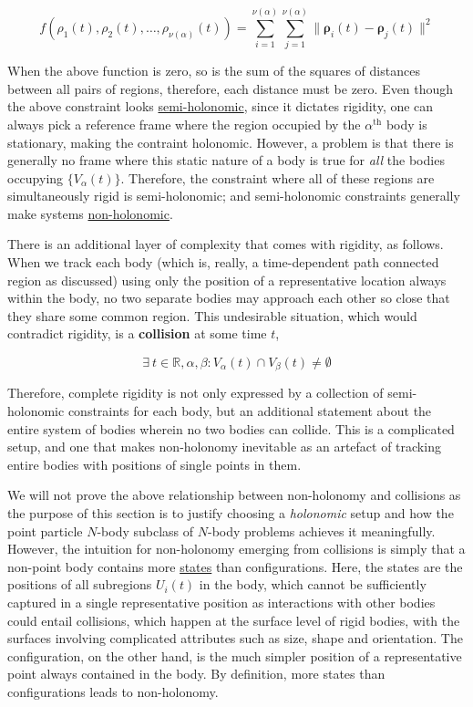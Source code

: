 \documentclass[oneside]{book}
\begin{document}
$$f(\rho_1(t), \rho_2(t), \dots, \rho_{\nu(\alpha)}(t)) = \sum_{i=1}^{\nu(\alpha)} \sum_{j=1}^{\nu(\alpha)} \| \pmb{\rho}_i(t) - \pmb{\rho}_j(t) \|^2$$

When the above function is zero, so is the sum of the squares of distances between all pairs of regions, therefore, each distance must be zero. Even though the above constraint looks \hyperref[semi_holonomic_constraint_defn]{semi-holonomic}, since it dictates rigidity, one can always pick a reference frame where the region occupied by the $\alpha^{\text{th}}$ body is stationary, making the contraint holonomic. However, a problem is that there is generally no frame where this static nature of a body is true for \emph{all} the bodies occupying $\{ V_\alpha(t) \}$. Therefore, the constraint where all of these regions are simultaneously rigid is semi-holonomic; and semi-holonomic constraints generally make systems \hyperref[non_holonomy_defn]{non-holonomic}.

There is an additional layer of complexity that comes with rigidity, as follows. When we track each body (which is, really, a time-dependent path connected region as discussed) using only the position of a representative location always within the body, no two separate bodies may approach each other so close that they share some common region. This undesirable situation, which would contradict rigidity, is a \textbf{collision} at some time $t$,

$$\exists \: t \in \mathbb{R}, \alpha, \beta : V_{\alpha}(t) \cap V_{\beta}(t) \neq \emptyset$$

Therefore, complete rigidity is not only expressed by a collection of semi-holonomic constraints for each body, but an additional statement about the entire system of bodies wherein no two bodies can collide. This is a complicated setup, and one that makes non-holonomy inevitable as an artefact of tracking entire bodies with positions of single points in them. 

We will not prove the above relationship between non-holonomy and collisions as the purpose of this section is to justify choosing a \emph{holonomic} setup and how the point particle $N$-body subclass of $N$-body problems achieves it meaningfully. However, the intuition for non-holonomy emerging from collisions is simply that a non-point body contains more \hyperref[states_defn]{states} than configurations. Here, the states are the positions of all subregions $U_i(t)$ in the body, which cannot be sufficiently captured in a single representative position as interactions with other bodies could entail collisions, which happen at the surface level of rigid bodies, with the surfaces involving complicated attributes such as size, shape and orientation. The configuration, on the other hand, is the much simpler position of a representative point always contained in the body. By definition, more states than configurations leads to non-holonomy.
\end{document}
